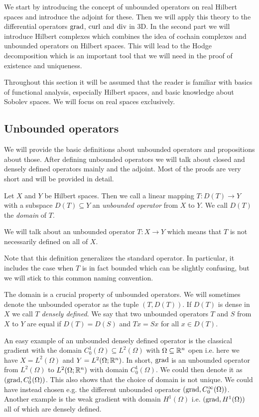 \documentclass[../master_thesis.tex]{subfiles}
\begin{document}
We start by introducing the concept of unbounded operators on real Hilbert spaces and 
introduce the adjoint for these. Then we will apply this theory to 
the differential operators $\operatorname{grad}$, $\operatorname{curl}$ and $\operatorname{div}$ in 3D. In the 
second part we will introduce Hilbert complexes which combines the idea 
of cochain complexes and unbounded operators on Hilbert spaces. This will lead to the 
Hodge decomposition which is an important tool that we will need in the proof of 
existence and uniqueness.

Throughout this section 
it will be assumed that the reader is familiar with basics of functional analysis, 
especially Hilbert spaces, 
and basic knowledge about Sobolev spaces. We will focus on real spaces 
exclusively.

\subsection{Unbounded operators}\label{sec:unbounded_operators}

We will provide the basic definitions about unbounded operators and propositions 
about those. After defining unbounded operators we will talk about closed and 
densely defined operators mainly and the adjoint. 
Most of the proofs are very short and will be provided in detail. 

\begin{definition}
    Let $X$ and $Y$ be Hilbert spaces. Then we call a linear mapping 
    $T: D(T) \rightarrow Y$ with a subspace $D(T) \subseteq Y$ an 
    \textit{unbounded 
    operator} from $X$ to $Y$. We call $D(T)$ the \textit{domain} of $T$.
\end{definition}
We will talk about an unbounded operator $T:X \rightarrow Y$ 
which means that $T$ is not necessarily defined on all of $X$. 

Note that this definition generalizes the standard operator. In particular, 
it includes the case when $T$ is in fact bounded which can be 
slightly confusing, but we will stick to this common naming convention. 

The domain is a crucial property of unbounded operators. We will sometimes 
denote the unbounded operator as the tuple $(T,D(T))$.
If $D(T)$ is dense in $X$ we call $T$ \textit{densely defined}. 
We say that two unbounded operators $T$ and $S$ from $X$ to $Y$ are equal 
if $D(T) = D(S)$ and $Tx = Sx$ for all $x\in D(T)$.

An easy
example of an unbounded densely defined operator is the classical gradient with 
the domain $C_0^1(\Omega) \subseteq L^2 (\Omega)$ 
with $\Omega \subseteq \mathbb{R}^n$ open i.e. here we have $X=L^2(\Omega)$ and 
$Y=L^2(\Omega;\mathbb{R}^n)$.
In short, $\operatorname{grad}$ is an unbounded operator from $L^2(\Omega)$ to 
$L^2(\Omega;\mathbb{R}^n)$ with domain $C_0^1(\Omega)$.
We could then denote it as $(\operatorname{grad}, C_0^1(\Omega))$. This also shows that 
the choice of domain is not unique. We could have instead chosen e.g. the 
different unbounded operator $(\operatorname{grad}, C_0^\infty (\Omega))$. 
Another example is the weak gradient with domain $H^1(\Omega)$ i.e.
$(\operatorname{grad}, H^1(\Omega))$ all of which are densely defined.
\end{document}
